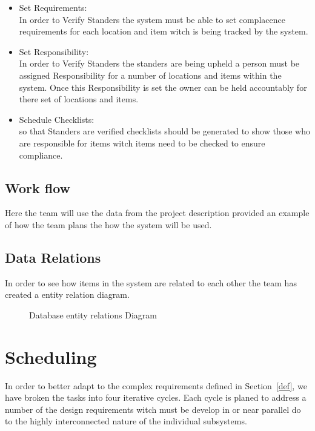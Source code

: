 \documentclass[Letter,11pt]{article}
\begin{document}
		\begin{itemize}
			\item Set Requirements:\\
			In order to Verify Standers the system must be able to set complacence requirements for each location and item witch is being tracked by the system.
			\item Set Responsibility:\\
			In order to Verify Standers the standers are being upheld a person must be assigned Responsibility for a number of locations and items within the system. Once this Responsibility is set the owner can be held accountably for there set of locations and items. 
			\item Schedule Checklists:\\
			so that Standers are verified  checklists should be generated to show those who are responsible for items witch items need to be checked to ensure compliance.
		\end{itemize}
		
	\subsection{Work flow}
		Here the team will use the data from the project description provided an example of how the team plans the how the system will be used.
		  
	
	\subsection{Data Relations}
		In order to see how items in the system are related to each other the team has created a entity relation diagram. 
		\begin{figure}[h]
			\centering
			
			\caption{\label{ERdiogram} Database entity relations Diagram}
		\end{figure}
		
	
\section{Scheduling}
		In order to better adapt to the complex requirements defined in Section~\ref{def}, we have broken the tasks into four iterative cycles. Each cycle is planed to address a number of the design requirements witch must be develop in or near parallel do to the highly interconnected nature of the individual subsystems. 
		
		
\end{document}
